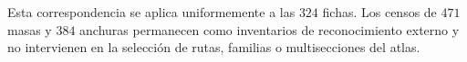 \endgroup

Esta correspondencia se aplica uniformemente a las \(324\) fichas. Los
censos de \(471\) masas y \(384\) anchuras permanecen como inventarios de
reconocimiento externo y no intervienen en la selección de rutas, familias
o multisecciones del atlas.

